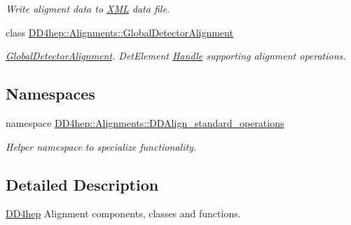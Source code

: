 \begin{DoxyCompactItemize}
\begin{DoxyCompactList}\small\item\em Write aligment data to \hyperlink{namespace_d_d4hep_1_1_x_m_l}{XML} data file. \item\end{DoxyCompactList}\item 
class \hyperlink{class_d_d4hep_1_1_alignments_1_1_global_detector_alignment}{DD4hep::Alignments::GlobalDetectorAlignment}
\begin{DoxyCompactList}\small\item\em \hyperlink{class_d_d4hep_1_1_alignments_1_1_global_detector_alignment}{GlobalDetectorAlignment}. DetElement \hyperlink{class_d_d4hep_1_1_handle}{Handle} supporting alignment operations. \item\end{DoxyCompactList}\end{DoxyCompactItemize}
\subsection*{Namespaces}
\begin{DoxyCompactItemize}
\item 
namespace \hyperlink{namespace_d_d4hep_1_1_alignments_1_1_d_d_align__standard__operations}{DD4hep::Alignments::DDAlign\_\-standard\_\-operations}


\begin{DoxyCompactList}\small\item\em Helper namespace to specialize functionality. \item\end{DoxyCompactList}\end{DoxyCompactItemize}


\subsection{Detailed Description}
\hyperlink{namespace_d_d4hep}{DD4hep} Alignment components, classes and functions. 
